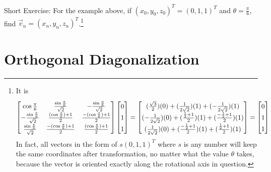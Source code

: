 Short Exercise: For the example above, if $(x_0, y_0, z_0)^T = (0,1,1)^T$ and $\theta = \frac{\pi}{6}$, find $\vec{v}_n = (x_n, y_n, z_n)^T$.\footnote{It is
\begin{align*}
\renewcommand\arraystretch{1.41}
\begin{bmatrix}
\cos{\frac{\pi}{6}} & \frac{\sin{\frac{\pi}{6}}}{\sqrt{2}} & -\frac{\sin{\frac{\pi}{6}}}{\sqrt{2}} \\
-\frac{\sin{\frac{\pi}{6}}}{\sqrt{2}} & \frac{(\cos{\frac{\pi}{6}}) + 1}{2} & \frac{-(\cos{\frac{\pi}{6}}) + 1}{2} \\
\frac{\sin\frac{\pi}{6}}{\sqrt{2}} & \frac{-(\cos{\frac{\pi}{6}}) + 1}{2} & \frac{(\cos{\frac{\pi}{6}}) + 1}{2}
\end{bmatrix}
\begin{bmatrix}
0 \\
1 \\
1
\end{bmatrix}
=
\begin{bmatrix}
(\frac{\sqrt{3}}{2})(0) + (\frac{1}{2\sqrt{2}})(1) + (-\frac{1}{2\sqrt{2}})(1) \\
(-\frac{1}{2\sqrt{2}})(0) + (\frac{\frac{1}{2} + 1}{2})(1) + (\frac{-\frac{1}{2} + 1}{2})(1) \\
(\frac{1}{2\sqrt{2}})(0) + (\frac{-\frac{1}{2} + 1}{2})(1) + (\frac{\frac{1}{2} + 1}{2})(1)
\end{bmatrix}
=
\begin{bmatrix}
0 \\
1 \\
1
\end{bmatrix}
\end{align*}
In fact, all vectors in the form of $s(0,1,1)^T$ where $s$ is any number will keep the same coordinates after transformation, no matter what the value $\theta$ takes, because the vector is oriented exactly along the rotational axis in question.}

\section{Orthogonal Diagonalization}
\label{section:orthogonaldiagreal}

